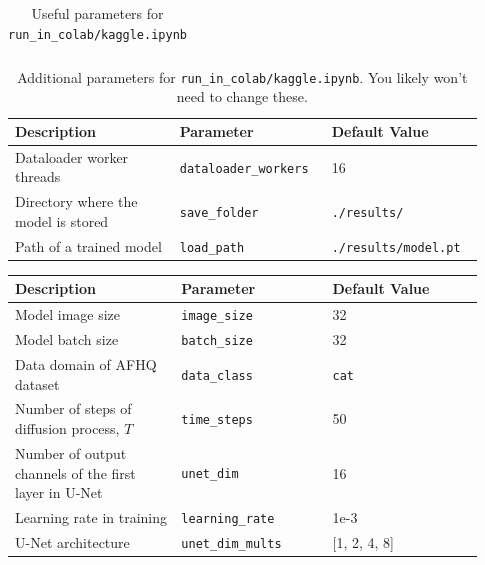 \documentclass[11pt,addpoints,answers]{exam}
\begin{document}
\begin{questions}
\begin{table}[H]
\begin{tabular}{|p{0.33\linewidth}|p{0.3\linewidth}|p{0.3\linewidth}|}
\end{tabular}
\caption{Useful parameters for \lstinline{run_in_colab/kaggle.ipynb}}
\label{table:flag}
\end{table}

\vspace{-1em}

\begin{table}[H]
\centering
\begin{tabular}{|p{0.33\linewidth}|p{0.3\linewidth}|p{0.3\linewidth}|}
\hline
Description & Parameter & Default Value \\ \hline
Dataloader worker threads  &  \lstinline|dataloader_workers| & 16 \\ \hline
Directory where the model is stored &  \lstinline|save_folder| & \lstinline|./results/| \\ \hline
Path of a trained model &  \lstinline|load_path| & \lstinline|./results/model.pt| \\ \hline

\end{tabular}
\caption{Additional parameters for \lstinline{run_in_colab/kaggle.ipynb}. You likely won't need to change these.}
\label{table:additional}
\end{table}

\vspace{-1em}

\begin{table}[H]
\centering
\begin{tabular}{|p{0.33\linewidth}|p{0.3\linewidth}|p{0.3\linewidth}|}
\hline
Description & Parameter & Default Value \\ \hline
Model image size &  \lstinline|image_size| & 32 \\ \hline
Model batch size &  \lstinline|batch_size | & 32 \\ \hline
Data domain of AFHQ dataset &  \lstinline|data_class| & \lstinline|cat| \\ \hline

Number of steps of diffusion process, $T$  &  \lstinline|time_steps| & 50 \\ \hline

Number of output channels of the first layer in U-Net  &  \lstinline|unet_dim| & 16 \\ \hline
Learning rate in training  &  \lstinline|learning_rate| & 1e-3 \\ \hline
U-Net architecture &  \lstinline|unet_dim_mults| & [1, 2, 4, 8] \\ \hline


\end{tabular}
\end{table}
\end{questions}
\end{document}
